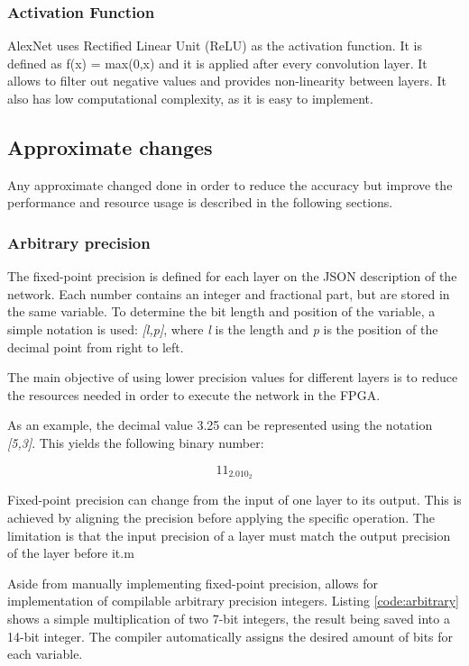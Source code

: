 \begin{enumerate}
\subsubsection{Activation Function}

AlexNet uses Rectified Linear Unit (ReLU) as the activation function. 
It is defined as f(x) = max(0,x) and it is applied after every convolution layer.
It allows to filter out negative values and provides non-linearity between layers. It also
has low computational complexity, as it is easy to implement.


\subsection{Approximate changes}

Any approximate changed done in order to reduce the accuracy but improve the performance
and resource usage is described in the following sections.

\subsubsection{Arbitrary precision}

The fixed-point precision is defined for each layer on the JSON description of the network.
Each number contains an integer and fractional part, but are stored in the same variable.
To determine the bit length and position of the variable, a simple notation is used: 
\textit{[l,p]}, where \textit{l} is the length and \textit{p} is the position of the decimal
point from right to left.

The main objective of using lower precision values for different layers is to reduce the
resources needed in order to execute the network in the FPGA.

As an example, the decimal value 3.25 can be represented using the notation \textit{[5,3]}.
This yields the following binary number:

$$
11_2.010_2
$$

Fixed-point precision can change from the input of one layer to its output. This is achieved
by aligning the precision before applying the specific operation. The limitation is that the
input precision of a layer must match the output precision of the layer before it.m

Aside from manually implementing fixed-point precision, \intelOCL allows for implementation
of compilable arbitrary precision integers. Listing \ref{code:arbitrary} shows a simple
multiplication of two 7-bit integers, the result being saved into a 14-bit integer. The
compiler automatically assigns the desired amount of bits for each variable.


\end{enumerate}
